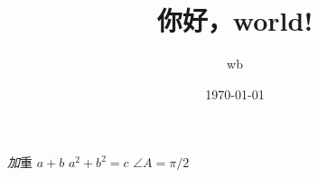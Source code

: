 \documentclass[12pt]{ctexart}
\title{你好，world!}
\author{wb}
\date{\today}
\begin{document}
\maketitle
\tableofcontents



\emph 加重
$a+b$
$a^2+b^2=c$
$\angle A=\pi/2$
\end{document}
